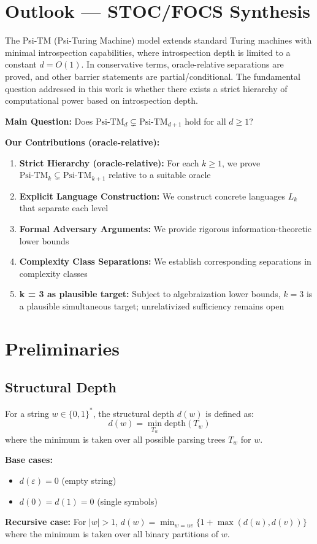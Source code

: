 
\section{Outlook — STOC/FOCS Synthesis}

The Psi-TM (Psi-Turing Machine) model extends standard Turing machines with minimal introspection capabilities, where introspection depth is limited to a constant $d = O(1)$. In conservative terms, oracle-relative separations are proved, and other barrier statements are partial/conditional. The fundamental question addressed in this work is whether there exists a strict hierarchy of computational power based on introspection depth.

\textbf{Main Question:} Does $\text{Psi-TM}_d \subsetneq \text{Psi-TM}_{d+1}$ hold for all $d \geq 1$?

\textbf{Our Contributions (oracle-relative):}
\begin{enumerate}
\item \textbf{Strict Hierarchy (oracle-relative):} For each $k \geq 1$, we prove $\text{Psi-TM}_k \subsetneq \text{Psi-TM}_{k+1}$ relative to a suitable oracle
\item \textbf{Explicit Language Construction:} We construct concrete languages $L_k$ that separate each level
\item \textbf{Formal Adversary Arguments:} We provide rigorous information-theoretic lower bounds
\item \textbf{Complexity Class Separations:} We establish corresponding separations in complexity classes
\item \textbf{k = 3 as plausible target:} Subject to algebraization lower bounds, $k=3$ is a plausible simultaneous target; unrelativized sufficiency remains open
\end{enumerate}

\section{Preliminaries}

\subsection{Structural Depth}

\begin{definition}
For a string $w \in \{0,1\}^*$, the structural depth $d(w)$ is defined as:
$$d(w) = \min_{T_w} \text{depth}(T_w)$$
where the minimum is taken over all possible parsing trees $T_w$ for $w$.

\textbf{Base cases:}
\begin{itemize}
\item $d(\varepsilon) = 0$ (empty string)
\item $d(0) = d(1) = 0$ (single symbols)
\end{itemize}

\textbf{Recursive case:}
For $|w| > 1$, $d(w) = \min_{w=uv} \{1 + \max(d(u), d(v))\}$ where the minimum is taken over all binary partitions of $w$.
\end{definition}

